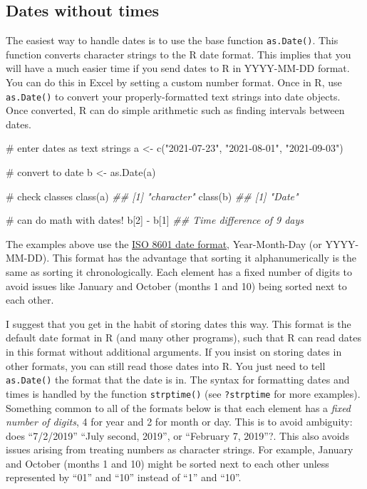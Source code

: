 \documentclass[
  13,
  letterpaper,
]{report}
\newenvironment{Shaded}{\begin{snugshade}}{\end{snugshade}}
\newcommand{\CommentTok}[1]{\textcolor[rgb]{0.37,0.37,0.37}{#1}}
\newcommand{\DecValTok}[1]{\textcolor[rgb]{0.68,0.00,0.00}{#1}}
\newcommand{\DocumentationTok}[1]{\textcolor[rgb]{0.37,0.37,0.37}{\textit{#1}}}
\newcommand{\FunctionTok}[1]{\textcolor[rgb]{0.28,0.35,0.67}{#1}}
\newcommand{\NormalTok}[1]{\textcolor[rgb]{0.00,0.23,0.31}{#1}}
\newcommand{\OtherTok}[1]{\textcolor[rgb]{0.00,0.23,0.31}{#1}}
\newcommand{\SpecialCharTok}[1]{\textcolor[rgb]{0.37,0.37,0.37}{#1}}
\newcommand{\StringTok}[1]{\textcolor[rgb]{0.13,0.47,0.30}{#1}}
\begin{document}
\subsection{Dates without times}\label{sec-05-date-date}

The easiest way to handle dates is to use the base function
\texttt{as.Date()}. This function converts character strings to the R
date format. This implies that you will have a much easier time if you
send dates to R in YYYY-MM-DD format. You can do this in Excel by
setting a custom number format. Once in R, use \texttt{as.Date()} to
convert your properly-formatted text strings into date objects. Once
converted, R can do simple arithmetic such as finding intervals between
dates.

\begin{Shaded}
\begin{Highlighting}[]

\CommentTok{\# enter dates as text strings}
\NormalTok{a }\OtherTok{\textless{}{-}} \FunctionTok{c}\NormalTok{(}\StringTok{"2021{-}07{-}23"}\NormalTok{, }\StringTok{"2021{-}08{-}01"}\NormalTok{, }\StringTok{"2021{-}09{-}03"}\NormalTok{)}

\CommentTok{\# convert to date}
\NormalTok{b }\OtherTok{\textless{}{-}} \FunctionTok{as.Date}\NormalTok{(a)}

\CommentTok{\# check classes}
\FunctionTok{class}\NormalTok{(a)}
\DocumentationTok{\#\# [1] "character"}
\FunctionTok{class}\NormalTok{(b)}
\DocumentationTok{\#\# [1] "Date"}

\CommentTok{\# can do math with dates!}
\NormalTok{b[}\DecValTok{2}\NormalTok{] }\SpecialCharTok{{-}}\NormalTok{ b[}\DecValTok{1}\NormalTok{]}
\DocumentationTok{\#\# Time difference of 9 days}
\end{Highlighting}
\end{Shaded}

The examples above use the
\href{https://en.wikipedia.org/wiki/ISO_8601}{ISO 8601 date format},
Year-Month-Day (or YYYY-MM-DD). This format has the advantage that
sorting it alphanumerically is the same as sorting it chronologically.
Each element has a fixed number of digits to avoid issues like January
and October (months 1 and 10) being sorted next to each other.

I suggest that you get in the habit of storing dates this way. This
format is the default date format in R (and many other programs), such
that R can read dates in this format without additional arguments. If
you insist on storing dates in other formats, you can still read those
dates into R. You just need to tell \texttt{as.Date()} the format that
the date is in. The syntax for formatting dates and times is handled by
the function \texttt{strptime()} (see \texttt{?strptime} for more
examples). Something common to all of the formats below is that each
element has a \emph{fixed number of digits}, 4 for year and 2 for month
or day. This is to avoid ambiguity: does ``7/2/2019'' ``July second,
2019'', or ``February 7, 2019''?. This also avoids issues arising from
treating numbers as character strings. For example, January and October
(months 1 and 10) might be sorted next to each other unless represented
by ``01'' and ``10'' instead of ``1'' and ``10''.
\end{document}
